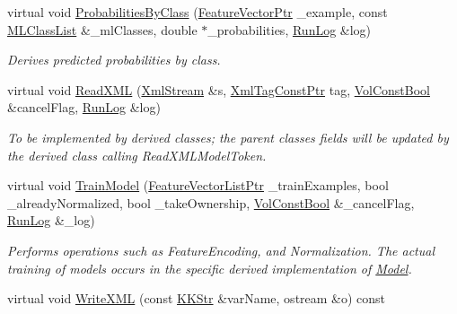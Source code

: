 \begin{DoxyCompactItemize}
\item 
virtual void \hyperlink{class_k_k_m_l_l_1_1_model_usf_cas_cor_a64224427bcf24341d23344f916b1a1bf}{Probabilities\+By\+Class} (\hyperlink{namespace_k_k_m_l_l_a0c5df3d48f45926fbc4fee04f5e3bc04}{Feature\+Vector\+Ptr} \+\_\+example, const \hyperlink{class_k_k_m_l_l_1_1_m_l_class_list}{M\+L\+Class\+List} \&\+\_\+ml\+Classes, double $\ast$\+\_\+probabilities, \hyperlink{class_k_k_b_1_1_run_log}{Run\+Log} \&log)
\begin{DoxyCompactList}\small\item\em Derives predicted probabilities by class. \end{DoxyCompactList}\item 
virtual void \hyperlink{class_k_k_m_l_l_1_1_model_usf_cas_cor_a33d9ec2c81c6fb684364e47bd08ee6e6}{Read\+X\+ML} (\hyperlink{class_k_k_b_1_1_xml_stream}{Xml\+Stream} \&s, \hyperlink{namespace_k_k_b_a5f1b0b1667d79fec26deeff10c43df23}{Xml\+Tag\+Const\+Ptr} tag, \hyperlink{namespace_k_k_b_a7d390f568e2831fb76b86b56c87bf92f}{Vol\+Const\+Bool} \&cancel\+Flag, \hyperlink{class_k_k_b_1_1_run_log}{Run\+Log} \&log)
\begin{DoxyCompactList}\small\item\em To be implemented by derived classes; the parent classes fields will be updated by the derived class calling Read\+X\+M\+L\+Model\+Token. \end{DoxyCompactList}\item 
virtual void \hyperlink{class_k_k_m_l_l_1_1_model_usf_cas_cor_a4bcd5585f141a9e11852e851e5fa9904}{Train\+Model} (\hyperlink{namespace_k_k_m_l_l_acf2ba92a3cf03e2b19674b24ff488ef6}{Feature\+Vector\+List\+Ptr} \+\_\+train\+Examples, bool \+\_\+already\+Normalized, bool \+\_\+take\+Ownership, \hyperlink{namespace_k_k_b_a7d390f568e2831fb76b86b56c87bf92f}{Vol\+Const\+Bool} \&\+\_\+cancel\+Flag, \hyperlink{class_k_k_b_1_1_run_log}{Run\+Log} \&\+\_\+log)
\begin{DoxyCompactList}\small\item\em Performs operations such as Feature\+Encoding, and Normalization. The actual training of models occurs in the specific derived implementation of \textquotesingle{}\hyperlink{class_k_k_m_l_l_1_1_model}{Model}\textquotesingle{}. \end{DoxyCompactList}\item 
virtual void \hyperlink{class_k_k_m_l_l_1_1_model_usf_cas_cor_ac63803b8c29a0b8679d360daf6d863dd}{Write\+X\+ML} (const \hyperlink{class_k_k_b_1_1_k_k_str}{K\+K\+Str} \&var\+Name, ostream \&o) const 
\end{DoxyCompactItemize}
